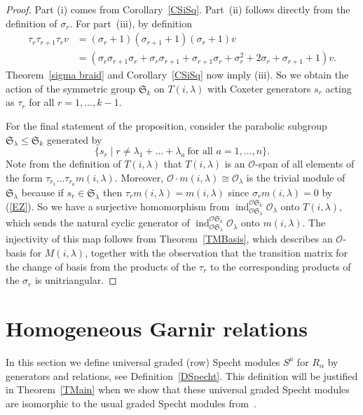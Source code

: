 \documentclass[twoside,11pt,reqno]{amsart}
\numberwithin{equation}{section}
\theoremstyle{definition}  %
\newcommand{\ind}{\operatorname{ind}}
\newcommand{\0}{{\bar 0}}
\newcommand{\1}{{\bar 1}}
\newcommand{\la}{\lambda}
\newcommand{\al}{\alpha}
\def\Si{\mathfrak{S}}
\newcommand{\si}{\sigma}
\def\triv#1{\O_{#1}}
\renewcommand\O{\mathcal O}
\begin{document}
\begin{proof}
Part (i) comes from Corollary~\ref{CSiSq}. Part~(ii) follows directly from the definition of $\sigma_r$. For
  part~(iii), by definition
  \begin{align*}
  \tau_r\tau_{r+1}\tau_rv
     &=(\sigma_r+1)(\sigma_{r+1}+1)
         (\sigma_r+1)v\\
     &=(\sigma_r\sigma_{r+1}\sigma_r
     +\sigma_r\sigma_{r+1}+\sigma_{r+1}\sigma_r+\sigma_r^2
     +2\sigma_r+\sigma_{r+1}+1)v.
  \end{align*} 
Theorem~\ref{sigma braid} and Corollary~\ref{CSiSq} now imply (iii).
So we obtain the action of the symmetric group $\Si_k$ on $T(i,\la)$ with Coxeter generators $s_r$ acting as $\tau_r$ for all $r=1,\dots,k-1$. 

For the final statement of the proposition, consider the parabolic subgroup $\Si_\la\leq \Si_k$ generated by 
$$
\{s_r\mid r\neq \la_1+\dots+\la_a\ \text{for all $a=1,\dots,n$}\}.
$$ 
Note from the definition of $T(i,\la)$ that $T(i,\la)$ is an $\O$-span of all elements of the form
$\tau_{r_1}\dots\tau_{r_a}m(i,\la)$. Moreover, $\O\cdot m(i,\la)\cong\triv{\la}$ is the trivial module
of~$\Si_\la$ because if $s_r\in\Si_\la$ then $\tau_r m(i,\la)=m(i,\la)$ since $\sigma_rm(i,\la)=0$  by
(\ref{EZ}). So we have a surjective homomorphism from $\ind_{\O\Si_\la}^{\O\Si_k}\triv{\la}$ onto $T(i,\la)$,
which sends the natural cyclic generator of $\ind_{\O\Si_\la}^{\O\Si_k}\triv{\la}$ onto $m(i,\la)$. The
injectivity of this map follows from Theorem~\ref{TMBasis}, which describes an $\O$-basis for $M(i,\la)$,
together with the observation that the transition matrix for the change of basis from the products of the
$\tau_r$ to the corresponding products of the $\si_r$ is unitriangular. 
\end{proof}












\section{Homogeneous Garnir relations}\label{SHGR}
In this section we define universal graded (row) Specht modules $S^\mu$ for $R_\al$ by generators and relations, see
Definition~\ref{DSpecht}. This definition will be justified in Theorem~\ref{TMain} when
we show that these universal graded Specht modules are isomorphic to the usual graded Specht modules from~\cite{BKW,HM}.
\end{document}
